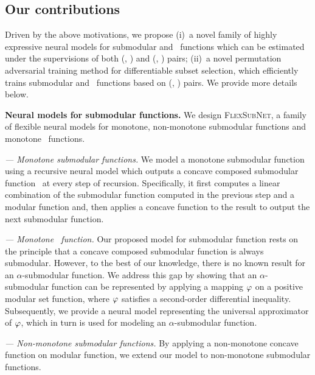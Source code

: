 \documentclass{article}
\newcommand{\ehdr}[1]{\noindent\emph{#1.}}
\newcommand{\our}{\textsc{Flex\-Sub\-Net}}
\newcommand{\xhdr}[1]{\noindent\textbf{#1.}}
\renewcommand{\cite}{\citep}
\begin{document}
\subsection{Our contributions}

Driven by the above motivations, we propose (i)~a novel family of highly expressive neural models
for submodular and \asb\ functions which can be estimated
under the supervisions of both (\tset, \tvalue)   
and (\tuniv, \thigh) pairs; (ii)~a novel permutation adversarial training method for differentiable subset selection, which efficiently trains  submodular and \asb\ functions based on (\tuniv, \thigh) pairs.  We provide more details below.

\xhdr{Neural models for submodular functions} 
We design \our, a family of flexible neural  models for monotone, non-monotone submodular functions and monotone \asb\ functions.
%

\ehdr{--- Monotone submodular functions}  We model a monotone submodular function using a recursive neural model which outputs a concave composed submodular function~\cite{csm2,csm3,lin2011class} at every step of recursion. Specifically, it first computes a linear combination of the submodular function computed in the previous step and a modular function and, then applies a concave function to the result to output the next submodular function.

\ehdr{--- Monotone \asb\ function} Our proposed model for submodular function rests on the principle that a concave composed submodular function is always submodular. However, to the best of our knowledge, there is no known result for an $\alpha$-submodular function. We address this gap by showing that  an $\alpha$-submodular function can be represented by applying a mapping $\varphi$ on a positive modular set function, where $\varphi$ satisfies a second-order differential inequality. Subsequently, we provide a neural model representing the universal approximator of $\varphi$, which in turn is used  for modeling an $\alpha$-submodular function.

\ehdr{--- Non-monotone submodular functions}
By applying a non-monotone concave function on modular function,
we extend our model to non-monotone submodular functions.

\end{document}
